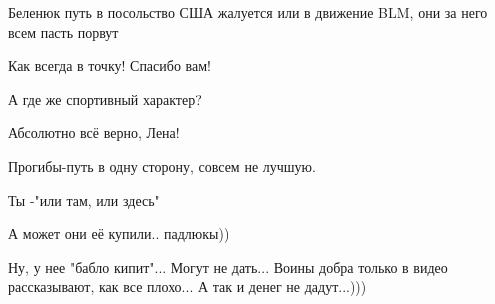 \begin{itemize}
\begin{itemize}
 
Беленюк путь в посольство США жалуется или в движение BLM, они за него всем пасть порвут \Smiley[1.0][yellow]
\end{itemize}

 
Как всегда в точку! Спасибо вам!

 
А где же спортивный характер?

 

Абсолютно всё верно, Лена!

Прогибы-путь в одну сторону, совсем не лучшую.

Ты -"или там, или здесь"

 
А может они её купили.. падлюкы))

 
Ну, у нее "бабло кипит"... Могут не дать... Воины добра только в видео
рассказывают, как все плохо... А так и денег не дадут...)))


\end{itemize}
